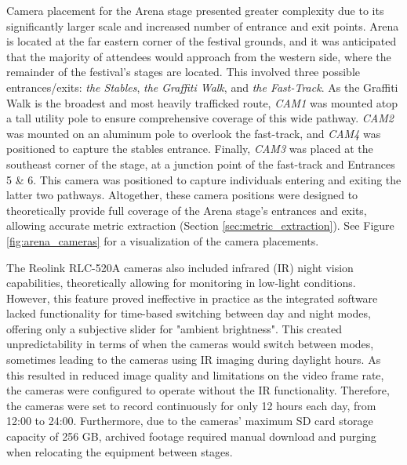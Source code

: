 Camera placement for the Arena stage presented greater complexity due to its significantly larger scale and increased number of entrance and exit points. Arena is located at the far eastern corner of the festival grounds, and it was anticipated that the majority of attendees would approach from the western side, where the remainder of the festival's stages are located. This involved three possible entrances/exits: \textit{the Stables}, \textit{the Graffiti Walk}, and \textit{the Fast-Track}. As the Graffiti Walk is the broadest and most heavily trafficked route, \textit{CAM1} was mounted atop a tall utility pole to ensure comprehensive coverage of this wide pathway. \textit{CAM2} was mounted on an aluminum pole to overlook the fast-track, and \textit{CAM4} was positioned to capture the stables entrance. Finally, \textit{CAM3} was placed at the southeast corner of the stage, at a junction point of the fast-track and Entrances 5 \& 6. This camera was positioned to capture individuals entering and exiting the latter two pathways. Altogether, these camera positions were designed to theoretically provide full coverage of the Arena stage's entrances and exits, allowing accurate metric extraction (Section \ref{sec:metric_extraction}). See Figure \ref{fig:arena_cameras} for a visualization of the camera placements.

The Reolink RLC-520A cameras also included infrared (IR) night vision capabilities, theoretically allowing for monitoring in low-light conditions. However, this feature proved ineffective in practice as the integrated software lacked functionality for time-based switching between day and night modes, offering only a subjective slider for "ambient brightness". This created unpredictability in terms of when the cameras would switch between modes, sometimes leading to the cameras using IR imaging during daylight hours. As this resulted in reduced image quality and limitations on the video frame rate, the cameras were configured to operate without the IR functionality. Therefore, the cameras were set to record continuously for only 12 hours each day, from 12:00 to 24:00. Furthermore, due to the cameras' maximum SD card storage capacity of 256 GB, archived footage required manual download and purging when relocating the equipment between stages.

